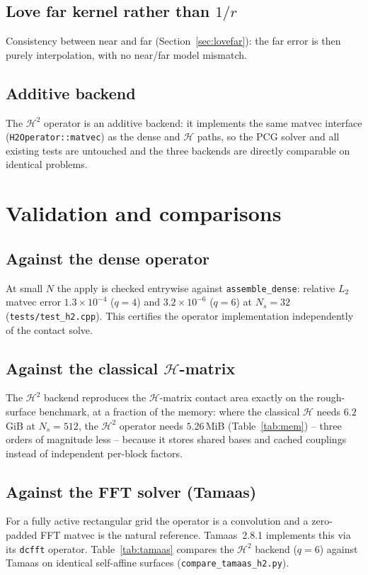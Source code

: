 \documentclass[11pt,a4paper]{article}
\newcommand{\Htwo}{\mathcal{H}^2}
\newcommand{\Hmat}{\mathcal{H}}
\newcommand{\code}[1]{\texttt{#1}}
\theoremstyle{definition}
\theoremstyle{remark}
\begin{document}
\subsection{Love far kernel rather than $1/r$}
Consistency between near and far (Section~\ref{sec:lovefar}): the far error is
then purely interpolation, with no near/far model mismatch.

\subsection{Additive backend}
The $\Htwo$ operator is an additive backend: it implements the same
matvec interface (\code{H2Operator::matvec}) as the dense and $\Hmat$ paths, so
the PCG solver and all existing tests are untouched and the three backends are
directly comparable on identical problems.

\section{Validation and comparisons}
\label{sec:valid}

\subsection{Against the dense operator}
At small $N$ the apply is checked entrywise against \code{assemble\_dense}:
relative $L_2$ matvec error $1.3\times10^{-4}$ ($q=4$) and $3.2\times10^{-6}$
($q=6$) at $N_s=32$ (\code{tests/test\_h2.cpp}). This certifies the operator
implementation independently of the contact solve.

\subsection{Against the classical $\Hmat$-matrix}
The $\Htwo$ backend reproduces the $\Hmat$-matrix contact area exactly on the
rough-surface benchmark, at a fraction of the memory: where the classical
$\Hmat$ needs $6.2$\,GiB at $N_s=512$, the $\Htwo$ operator needs $5.26$\,MiB
(Table~\ref{tab:mem}) -- three orders of magnitude less -- because it stores
shared bases and cached couplings instead of independent per-block factors.

\subsection{Against the FFT solver (Tamaas)}
For a fully active rectangular grid the operator is a convolution and a
zero-padded FFT matvec is the natural reference. Tamaas~2.8.1 implements this via
its \code{dcfft} operator. Table~\ref{tab:tamaas} compares the $\Htwo$ backend
($q=6$) against Tamaas on identical self-affine surfaces
(\code{compare\_tamaas\_h2.py}).
\end{document}
